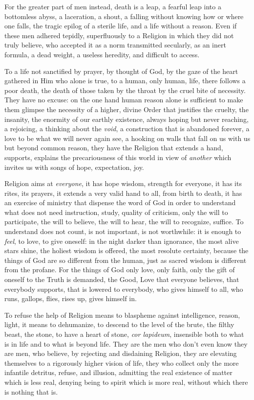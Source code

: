 For the greater part of men instead, death is a leap, a fearful leap into a bottomless abyss, a laceration, a shout, a falling without knowing how or where one falls, the tragic epilog of a sterile life, and a life without a reason. Even if these men adhered tepidly, superfluously to a Religion in which they did not truly believe, who accepted it as a norm transmitted secularly, as an inert formula, a dead weight, a useless heredity, and difficult to access.

To a life not sanctified by prayer, by thought of God, by the gaze of the heart gathered in Him who alone is true, to a human, only human, life, there follows a poor death, the death of those taken by the throat by the cruel bite of necessity. They have no excuse: on the one hand human reason alone is sufficient to make them glimpse the necessity of a higher, divine Order that justifies the cruelty, the insanity, the enormity of our earthly existence, always hoping but never reaching, a rejoicing, a thinking about the \emph{void}, a construction that is abandoned forever, a love to be what we will never again see, a hooking on walls that fall on us with us but beyond common reason, they have the Religion that extends a hand, supports, explains the precariousness of this world in view of \emph{another} which invites us with songs of hope, expectation, joy.

Religion aims at \emph{everyone}, it has hope wisdom, strength for everyone, it has its rites, its prayers, it extends a very valid hand to all, from birth to death, it has an exercise of ministry that dispense the word of God in order to understand what does not need instruction, study, quality of criticism, only the will to participate, the will to believe, the will to hear, the will to recognize, suffice. To understand does not count, is not important, is not worthwhile: it is enough to
\emph{feel}, to love, to give oneself: in the night darker than ignorance, the most alive stars shine, the holiest wisdom is offered, the most resolute certainty, because the things of God are so different from the human, just as sacred wisdom is different from the profane. For the things of God only love, only faith, only the gift of oneself to the Truth is demanded, the Good, Love that everyone believes, that everybody supports, that is lowered to everybody, who gives himself to all, who runs, gallops, flies, rises up, gives himself in.

To refuse the help of Religion means to blaspheme against intelligence, reason, light, it means to dehumanize, to descend to the level of the brute, the filthy beast, the stone, to have a heart of stone, \emph{cor lapideum}, insensible both to what is in life and to what is beyond life. They are the men who don't even know they are men, who believe, by rejecting and disdaining Religion, they are elevating themselves to a rigorously higher vision of life, they who collect only the more infantile detritus, refuse, and illusion, admitting the real existence of matter which is less real, denying being to spirit which is more real, without which there is nothing that is.

